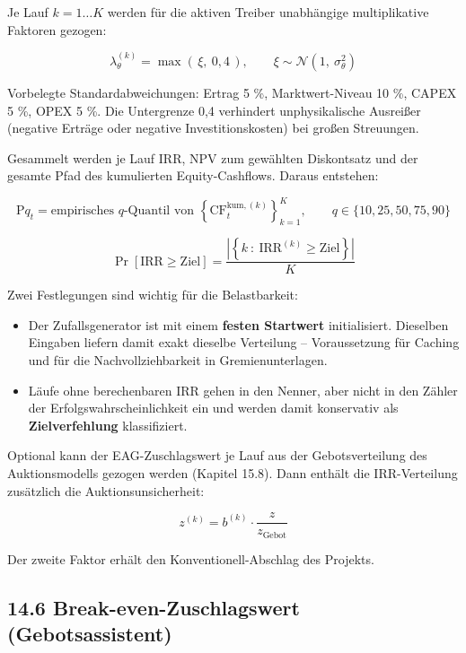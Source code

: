 \documentclass[
  a4paper,
  10pt]{article}
\providecommand{\tightlist}{%
  \setlength{\itemsep}{0pt}\setlength{\parskip}{0pt}}
\begin{document}
Je Lauf \(k = 1 \dots K\) werden für die aktiven Treiber unabhängige
multiplikative Faktoren gezogen:

\[ \lambda^{(k)}_\theta = \max\left(\,\xi,\ 0{,}4\,\right), \qquad \xi \sim \mathcal{N}\left(1,\ \sigma_\theta^2\right) \]

Vorbelegte Standardabweichungen: Ertrag 5 \%, Marktwert-Niveau 10 \%,
CAPEX 5 \%, OPEX 5 \%. Die Untergrenze 0,4 verhindert unphysikalische
Ausreißer (negative Erträge oder negative Investitionskosten) bei großen
Streuungen.

Gesammelt werden je Lauf IRR, NPV zum gewählten Diskontsatz und der
gesamte Pfad des kumulierten Equity-Cashflows. Daraus entstehen:

\[ \mathrm{P}q_t = \text{empirisches } q\text{-Quantil von } \left\{\mathrm{CF}^{\mathrm{kum},(k)}_t\right\}_{k=1}^{K}, \qquad q \in \{10, 25, 50, 75, 90\} \]

\[ \Pr\left[\mathrm{IRR} \geq \mathrm{Ziel}\right] = \frac{\left|\left\{k \ :\ \mathrm{IRR}^{(k)} \geq \mathrm{Ziel}\right\}\right|}{K} \]

Zwei Festlegungen sind wichtig für die Belastbarkeit:

\begin{itemize}
\tightlist
\item
  Der Zufallsgenerator ist mit einem \textbf{festen Startwert}
  initialisiert. Dieselben Eingaben liefern damit exakt dieselbe
  Verteilung -- Voraussetzung für Caching und für die
  Nachvollziehbarkeit in Gremienunterlagen.
\item
  Läufe ohne berechenbaren IRR gehen in den Nenner, aber nicht in den
  Zähler der Erfolgswahrscheinlichkeit ein und werden damit konservativ
  als \textbf{Zielverfehlung} klassifiziert.
\end{itemize}

Optional kann der EAG-Zuschlagswert je Lauf aus der Gebotsverteilung des
Auktionsmodells gezogen werden (Kapitel 15.8). Dann enthält die
IRR-Verteilung zusätzlich die Auktionsunsicherheit:

\[ z^{(k)} = b^{(k)} \cdot \frac{z}{z_{\mathrm{Gebot}}} \]

Der zweite Faktor erhält den Konventionell-Abschlag des Projekts.

\hypertarget{break-even-zuschlagswert-gebotsassistent}{%
\subsection{14.6 Break-even-Zuschlagswert
(Gebotsassistent)}\label{break-even-zuschlagswert-gebotsassistent}}
\end{document}
